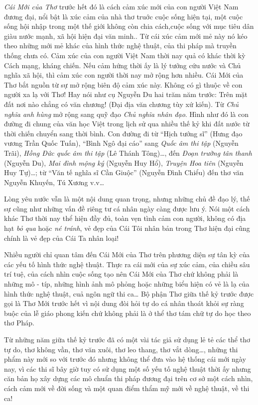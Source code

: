 \documentclass[../main.tex]{subfiles}
\begin{document}
\begin{multicols}{2}
\textit{Cái Mới của Thơ} trước hết đó là cách cảm xúc mới của con người Việt Nam đương đại, nổi bật là xúc cảm của nhà thơ truớc cuộc sống hiện tại, một cuộc sống hội nhập trong một thế giới không còn chia cách,cuộc sống với mục tiêu dân giàu nước mạnh, xã hội hiện đại văn minh.. Từ cái xúc cảm mới mẻ này nó kéo theo những mới mẻ khác của hình thức nghệ thuật, của thi pháp mà truyền thống chưa có. Cảm xúc của con người Việt Nam thời nay quả có khác thời kỳ Cách mạng, kháng chiến. Nếu cảm hứng thời ấy là lý tưởng cứu nước và Chủ nghĩa xã hội, thì cảm xúc con người thời nay mở rộng hơn nhiều. Cái Mới của Thơ bắt nguồn từ sự mở rộng biên độ cảm xúc này. Không có gì thuộc về con người xa lạ với Thơ! Hay nói như cụ Nguyễn Du hai trăm năm trước: Trên mặt đất nơi nào chẳng có văn chương! (Đại địa văn chương tùy xứ kiến). Từ \textit{Chủ nghĩa anh hùng } mở rộng sang quỹ đạo \textit{Chủ nghĩa nhân đạo}. Hình như đó là con đường đi chung của văn học Việt trong lịch sử qua nhiều thế kỷ khi đất nước từ thời chiến chuyển sang thời bình. Con đường đi từ “Hịch tướng sĩ” (Hưng đạo vương Trần Quốc Tuấn), “Bình Ngô đại cáo” sang \textit{Quốc âm thi tập} (Nguyễn Trãi), \textit{Hồng Đức quốc âm thi tập} (Lê Thánh Tông)…, đến \textit{Đoạn trường tân thanh} (Nguyễn Du), \textit{Mai đình mộng ký} (Nguyễn Huy Hổ), \textit{Truyện Hoa tiên} (Nguyễn Huy Tự)…; từ “Văn tế nghĩa sĩ Cần Giuộc” (Nguyễn Đình Chiểu) đến thơ văn Nguyễn Khuyến, Tú Xương v.v… 
 
Lòng yêu nước vẫn là một nội dung quan trọng, nhưng những chủ đề đạo lý, thế sự cũng như những vấn đề riêng tư cá nhân ngày càng được lưu ý. Nói một cách khác Thơ thời nay thể hiện đầy đủ, toàn vẹn tình cảm con người, không có địa hạt \textit{bỏ qua} hoặc \textit{né tránh}, vẻ đẹp của Cái Tôi nhân bản trong Thơ hiện đại cũng chính là vẻ đẹp của Cái Ta nhân loại! 
 
Nhiều người chỉ quan tâm đến Cái Mới của Thơ trên phương diện sự tân kỳ của các yếu tố hình thức nghệ thuật. Thực ra cái mới của sự xúc cảm, của chiều sâu trí tuệ, của cách nhìn cuộc sống tạo nên Cái Mới của Thơ chứ không phải là những mô - típ, những hình ảnh mô phỏng hoặc  những biểu hiện có vẻ là lạ của hình thức nghệ thuật, cuả ngôn ngữ thi ca… Bộ phận Thơ giữa thế kỷ trước được gọi là Thơ Mới trước hết vì nội dung đòi hỏi tự do cá nhân thoát khỏi sự ràng buộc của lễ giáo phong kiến chứ không phải là ở thể thơ tám chữ tự do học theo thơ Pháp. 
 
Từ những năm giữa thế kỷ trước đã có một vài tác giả sử dụng lẻ tẻ các thể thơ tự do, thơ không vần, thơ văn xuôi, thơ leo thang, thơ vắt dòng…, những thi phẩm này mới so với trước đó nhưng không thể đưa vào hệ thống cái mới ngày nay, vì các thi sĩ bây giờ tuy có sử dụng một số yếu tố nghệ thuật thời ấy nhưng căn bản họ xây dựng các mô chuẩn thi pháp đương đại trên cơ sở một cách nhìn, cách cảm mới về đời sống và một quan điểm thẩm mỹ mới về nghệ thuật, về thi ca! 
 

\end{multicols}
\end{document}
